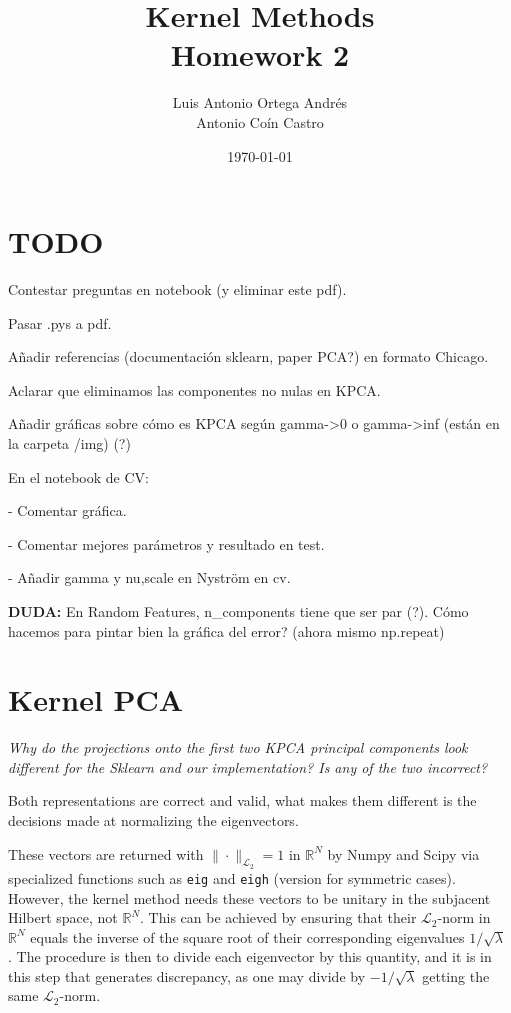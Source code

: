 \documentclass[11pt]{article}
\author{Luis Antonio Ortega Andrés\\Antonio Coín Castro}
\date{\today}
\title{Kernel Methods\\\medskip
\large Homework 2}
\begin{document}
\maketitle

\section{TODO}

Contestar preguntas en notebook (y eliminar este pdf).

Pasar .pys a pdf.

Añadir referencias (documentación sklearn, paper PCA?) en formato Chicago.

Aclarar que eliminamos las componentes no nulas en KPCA.

Añadir gráficas sobre cómo es KPCA según gamma->0 o gamma->inf (están en la carpeta /img) (?)

En el notebook de CV:

- Comentar gráfica.

- Comentar mejores parámetros y resultado en test.

- Añadir gamma y nu,scale en Nyström en cv.

\textbf{DUDA:} En Random Features, n\_components tiene que ser par (?). Cómo hacemos para pintar bien la gráfica del error? (ahora mismo np.repeat)

\section*{Kernel PCA}

\emph{Why do the projections onto the first two KPCA principal components look different for the Sklearn and our implementation? Is any of the two incorrect?}

Both representations are correct and valid, what makes them different is the decisions made at normalizing the eigenvectors.

These vectors are returned with \(\|\cdot \|_{\mathcal{L}_2} = 1\) in \( \mathbb{R}^N \)  by Numpy and Scipy via specialized functions such as \texttt{eig} and \texttt{eigh} (version for symmetric cases). However, the kernel method needs these vectors to be unitary in the subjacent Hilbert space, not \( \mathbb{R}^N \). This can be achieved by ensuring that their \( \mathcal{L}_2 \)-norm in \( \mathbb{R}^N \)  equals the inverse of the square root of their corresponding eigenvalues \( 1/\sqrt{\lambda} \) . The procedure is then to divide each eigenvector by this quantity, and it is in this step that generates discrepancy, as one may divide by \( -1/\sqrt{\lambda} \) getting the same \( \mathcal{L}_2 \)-norm.
\end{document}
